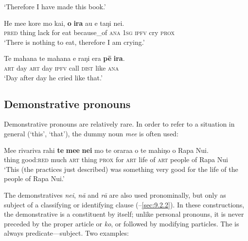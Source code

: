 \glt 
‘Therefore I have made this book.’ \textstyleExampleref{[R531.014]} 
\z

\ea\label{ex:4.236}
\gll He me{\ꞌ}e kore mo kai, \textbf{{\ꞌ}o} \textbf{ira} au e taŋi nei. \\
\textsc{pred} thing lack for eat because\_of \textsc{ana} \textsc{1sg} \textsc{ipfv} cry \textsc{prox} \\

\glt 
‘There is nothing to eat, therefore I am crying.’ \textstyleExampleref{[R349.013]} 
\z

\ea\label{ex:4.237}
\gll Te mahana te mahana e raŋi era \textbf{pē} \textbf{ira}. \\
\textsc{art} day \textsc{art} day \textsc{ipfv} call \textsc{dist} like \textsc{ana} \\

\glt 
‘Day after day he cried like that.’ \textstyleExampleref{[R213.003]} 
\z
{}
\subsection{Demonstrative pronouns}\label{sec:4.6.6}

Demonstrative pronouns are relatively rare. In order to refer to a situation in general (‘this’, ‘that’), the dummy noun \textit{me{\ꞌ}e} is often used:

\ea\label{ex:4.238}
\gll Me{\ꞌ}e rivariva rahi \textbf{te} \textbf{me{\ꞌ}e} \textbf{nei} mo te orara{\ꞌ}a o te mahiŋo o Rapa Nui. \\
thing good:\textsc{red} much \textsc{art} thing \textsc{prox} for \textsc{art} life of \textsc{art} people of Rapa Nui \\

\glt 
‘This (the practices just described) was something very good for the life of the people of Rapa Nui.’ \textstyleExampleref{[R231.314]} 
\z

The demonstratives \textit{nei}, \textit{nā} and \textit{rā} are also used pronominally, but only as subject of a classifying or identifying clause (–\ref{sec:9.2.2}). In these constructions, the demonstrative is a constituent by itself; unlike personal pronouns, it is never preceded by the proper article or \textit{ko}, or followed by modifying particles. The  is always predicate—subject. Two examples:

